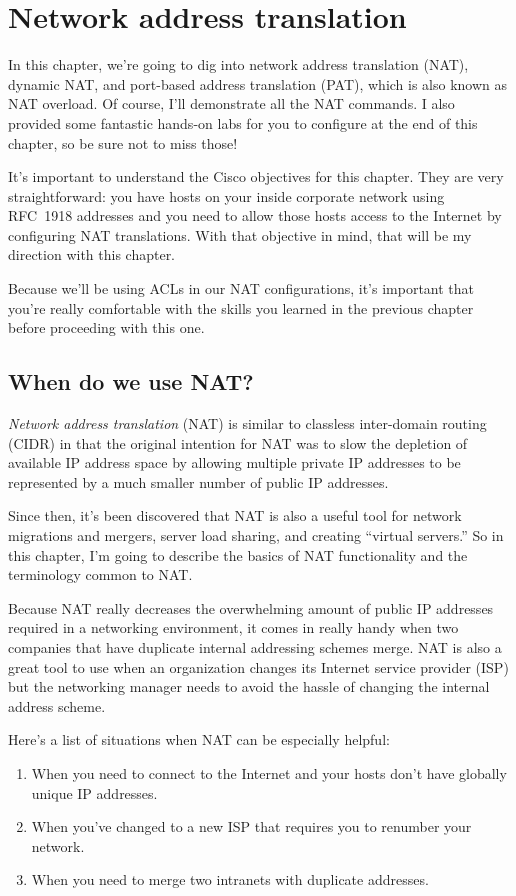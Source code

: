 \chapter{Network address translation}
\label{chap:nat}

In this chapter, we're going to dig into network address translation (NAT), dynamic NAT, and port-based address translation (PAT), which is also known as NAT overload.
Of course, I'll demonstrate all the NAT commands.
I also provided some fantastic hands-on labs for you to configure at the end of this chapter, so be sure not to miss those!

It's important to understand the Cisco objectives for this chapter. They are very straightforward: you have hosts on your inside corporate
network using RFC~1918 addresses and you need to allow those hosts access to the Internet by configuring NAT translations. With that
objective in mind, that will be my direction with this chapter.

Because we'll be using ACLs in our NAT configurations, it's important
that you're really comfortable with the skills you learned in the
previous chapter before proceeding with this one.

\section{When do we use NAT?}

\emph{Network address translation} (NAT) is similar to classless inter-domain routing (CIDR) in that the original intention for NAT was to slow
the depletion of available IP address space by allowing multiple
private IP addresses to be represented by a much smaller number of public IP addresses.

Since then, it's been discovered that NAT is also a useful tool for network migrations and mergers, server load sharing, and creating
``virtual servers.''
So in this chapter, I'm going to describe the basics of NAT functionality and the terminology common to NAT.

Because NAT really decreases the overwhelming amount of public IP addresses required in a networking environment, it comes in really handy
when two companies that have duplicate internal addressing schemes merge. NAT is also a great tool to use when an organization changes its
Internet service provider (ISP) but the networking manager needs to avoid the hassle of changing the internal address scheme.

Here's a list of situations when NAT can be especially helpful:
\begin{enumerate}
   \item When you need to connect to the Internet and your hosts don't have   globally unique IP addresses.
   \item When you've changed   to a new ISP that requires you to renumber your network.
   \item When you need to merge two intranets with duplicate addresses.
\end{enumerate}

